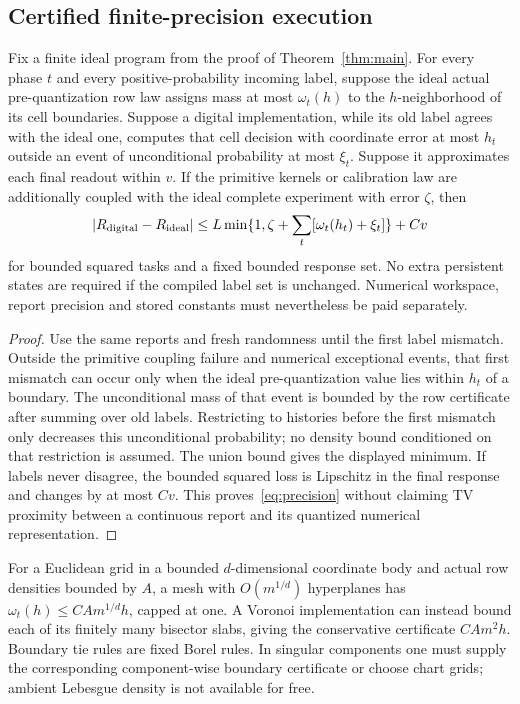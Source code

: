 \subsection{Certified finite-precision execution}
\begin{proposition}\label{prop:precision}
Fix a finite ideal program from the proof of Theorem~\ref{thm:main}. For every phase $t$ and every positive-probability incoming label, suppose the ideal actual pre-quantization row law assigns mass at most $\omega_t(h)$ to the $h$-neighborhood of its cell boundaries. Suppose a digital implementation, while its old label agrees with the ideal one, computes that cell decision with coordinate error at most $h_t$ outside an event of unconditional probability at most $\xi_t$. Suppose it approximates each final readout within $v$. If the primitive kernels or calibration law are additionally coupled with the ideal complete experiment with error $\zeta$, then
\begin{equation}\label{eq:precision}
 |R_{\rm digital}-R_{\rm ideal}|
 \le L\min\{1,\zeta+\sum_t[\omega_t(h_t)+\xi_t]\}+C v
\end{equation}
for bounded squared tasks and a fixed bounded response set. No extra persistent states are required if the compiled label set is unchanged. Numerical workspace, report precision and stored constants must nevertheless be paid separately.
\end{proposition}
\begin{proof}
Use the same reports and fresh randomness until the first label mismatch. Outside the primitive coupling failure and numerical exceptional events, that first mismatch can occur only when the ideal pre-quantization value lies within $h_t$ of a boundary. The unconditional mass of that event is bounded by the row certificate after summing over old labels. Restricting to histories before the first mismatch only decreases this unconditional probability; no density bound conditioned on that restriction is assumed. The union bound gives the displayed minimum. If labels never disagree, the bounded squared loss is Lipschitz in the final response and changes by at most $Cv$. This proves~\eqref{eq:precision} without claiming TV proximity between a continuous report and its quantized numerical representation.
\end{proof}
For a Euclidean grid in a bounded $d$-dimensional coordinate body and actual row densities bounded by $A$, a mesh with $O(m^{1/d})$ hyperplanes has $\omega_t(h)\le C A m^{1/d}h$, capped at one. A Voronoi implementation can instead bound each of its finitely many bisector slabs, giving the conservative certificate $C A m^2h$. Boundary tie rules are fixed Borel rules. In singular components one must supply the corresponding component-wise boundary certificate or choose chart grids; ambient Lebesgue density is not available for free.

